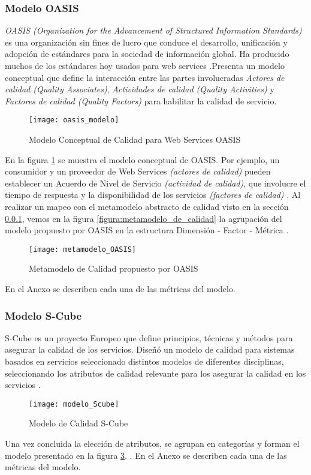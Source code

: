 \subsubsection{Modelo OASIS}
\label{MarcoConceptual:modelo_OASIS}
\emph{OASIS (Organization for the Advancement of Structured Information Standards)} es una organización sin fines de lucro que conduce el desarrollo, unificación y adopción de estándares para la sociedad de información global. Ha producido muchos de los estándares hoy usados para web services \cite{OASIS:def}.Presenta un modelo conceptual que define la interacción entre las partes involucradas \emph{Actores de calidad (Quality Associates)}, \emph{Actividades de calidad (Quality Activities)} y \emph{Factores de calidad (Quality Factors)} para habilitar la calidad de servicio.
  \begin{figure}[h]
    \centering
    \texttt{[image: oasis\_modelo]}
    \caption{Modelo Conceptual de Calidad para Web Services OASIS}
    \label{figura:oasis_modelo}
  \end{figure}
En la figura \ref{figura:oasis_modelo} se muestra el modelo conceptual de OASIS. Por ejemplo, un consumidor y un proveedor de Web Services \emph{(actores de calidad)} pueden establecer un Acuerdo de Nivel de Servicio \emph{(actividad de calidad)}, que involucre el tiempo de respuesta y la disponibilidad de los servicios \emph{(factores de calidad)} \cite{Tesis:LauraGonzalez:PlataformaESB}.
Al realizar un mapeo con el metamodelo abstracto de calidad visto en la sección \ref{MarcoConceptual:modelo_OASIS}, vemos en la figura \ref{figura:metamodelo_de_calidad} la agrupación del modelo propuesto por OASIS en la estructura Dimensión - Factor - Métrica \cite{Articulo:LauraGonzalez:CalidadWS}.
  \begin{figure}[h]
    \centering
    \texttt{[image: metamodelo\_OASIS]}
    \caption{Metamodelo de Calidad propuesto por OASIS}
    \label{figura:metamodelo_OASIS}
  \end{figure}
En el Anexo se describen cada una de las métricas del modelo.

\subsubsection{Modelo S-Cube}
\label{MarcoConceptual:modelo_SCube}
S-Cube es un proyecto Europeo que define  principios, técnicas y métodos  para asegurar la calidad de los servicios. Diseñó un modelo de calidad para sistemas basados en servicios seleccionado distintos modelos de diferentes disciplinas, seleccionando los atributos de calidad relevante para los asegurar la calidad en los servicios \cite{Scube}.
  \begin{figure}[h]
    \centering
    \texttt{[image: modelo\_Scube]}
    \caption{Modelo de Calidad S-Cube}
    \label{figura:modelo_Scube}
  \end{figure}
Una vez concluida la elección de atributos, se agrupan en categorías y forman el modelo presentado en la figura \ref{figura:modelo_Scube}. 
\cite{Articulo:LauraGonzalez:CalidadWS}.
En el Anexo se describen cada una de las métricas del modelo.

